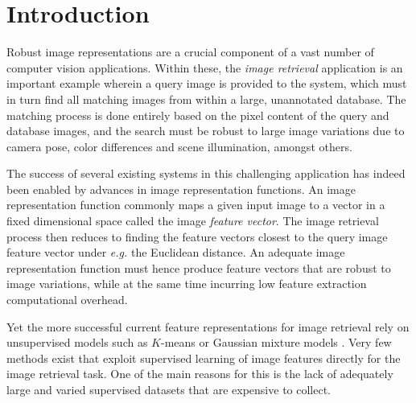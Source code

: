 \section{Introduction}

Robust image representations are a crucial component of a vast number of computer vision applications. Within these, the \emph{image retrieval} application is an important example wherein a query image is provided to the system, which must in turn find all matching images from within a large, unannotated database. The matching process is done entirely based on the pixel content of the query and database images, and the search must be robust to large image variations due to camera pose, color differences and scene illumination, amongst others.

The success of several existing systems in this challenging application has indeed been enabled by advances in  image representation functions. An image representation function commonly maps a given input image to a vector in a fixed dimensional space called the image \emph{feature vector}. The image retrieval process then reduces to finding the feature vectors closest to the query image feature vector under \textit{e.g.} the Euclidean distance. An adequate image representation function must hence produce feature vectors that are robust to image variations, while at the same time incurring low feature extraction computational overhead.


Yet the more successful current feature representations for image retrieval rely on unsupervised models such as $K$-means \cite{Delhumeau2013} or Gaussian mixture models \cite{Perronnin2010}. Very few methods \cite{Arandjelovic15,Rana,Bilen2015} exist that exploit supervised learning of image features directly for the image retrieval task. One of the main reasons for this is the lack of adequately large and varied supervised datasets that are expensive to collect.

